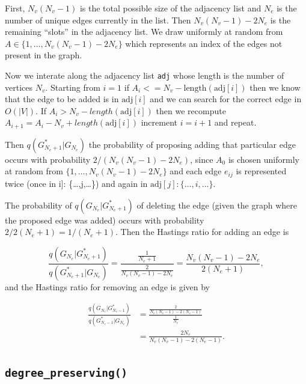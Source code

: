 \documentclass[11pt,a4paper]{article}
\numberwithin{equation}{section}
\begin{document}
First, \(N_v(N_v-1)\) is the total possible size of the adjacency list
and \(N_e\) is the number of unique edges currently in the list. Then
\(N_v(N_v-1) - 2N_e\) is the remaining ``slots'' in the adjacency list.
We draw uniformly at random from \(A \in \{1,\dots,N_v(N_v-1) - 2N_e\}\)
which represents an index of the edges not present in the graph.

Now we interate along the adjacency list \texttt{adj} whose length is
the number of vertices \(N_v\). Starting from \(i = 1\) if
\(A_i <= N_v - \text{length}(\text{adj}[i])\) then we know that the edge
to be added is in \(\text{adj}[i]\) and we can search for the correct
edge in \(O(|V|)\). If \(A_i > N_v - length(\text{adj}[i])\) then we
recompute \(A_{i+1} = A_i - N_v + length(\text{adj}[i])\) increment
\(i = i + 1\) and repeat.

Then \(q(G^*_{N_e+1}|G_{N_e})\) the probability of proposing adding that
particular edge occurs with probability \(2/(N_v(N_v-1) - 2N_e)\), since
\(A_0\) is chosen uniformly at random from
\(\{1,\dots,N_v(N_v-1) - 2N_e\}\) and each edge \(e_{ij}\) is
represented twice (once in \text{adj}{[}i{]}: \{\dots,j,\dots\}) and
again in \(\text{adj}[j]: \{\dots,i,\dots\}\).

The probability of \(q(G_{N_e}|G^*_{N_e+1})\) of deleting the edge
(given the graph where the proposed edge was added) occurs with
probability \(2/2(N_e+1) = 1/(N_e+1)\). Then the Hastings ratio for
adding an edge is

\[\frac{q(G_{N_e}|G^*_{N_e+1})}{q(G^*_{N_e+1}|G_{N_e})} = \frac{\frac{1}{N_e+1}}{\frac{2}{N_v(N_v-1) - 2N_e}} = \frac{N_v(N_v-1) - 2N_e}{2(N_e+1)},\]
and the Hastings ratio for removing an edge is given by

\[ \begin{aligned} \frac{q(G_{N_e}|G^*_{N_e-1})}{q(G^*_{N_e-1}|G_{N_e})} & = \frac{\frac{2}{N_v(N_v-1) - 2(N_e-1)}}{\frac{1}{N_e}} \\ &= \frac{2N_e}{N_v(N_v-1) - 2(N_e-1)}. \end{aligned}\]

\hypertarget{degree_preserving}{%
\subsection{\texorpdfstring{\texttt{degree\_preserving()}}{degree\_preserving()}}\label{degree_preserving}}
\end{document}
